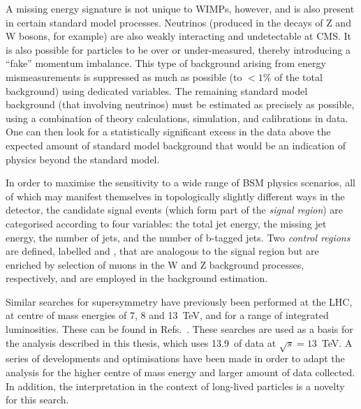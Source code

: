 A missing energy signature is not unique to WIMPs, however, and is also present 
in certain standard model processes. Neutrinos (produced in the decays of Z and 
W bosons, for example) are also weakly interacting and undetectable at CMS. It 
is also possible for particles to be over or under-measured, thereby 
introducing a ``fake'' momentum imbalance. This type of background arising from 
energy mismeasurements is suppressed as much as possible (to $<1\%$ of the 
total background) using dedicated variables. %
The remaining standard 
model background (that involving neutrinos) must be estimated as precisely as 
possible, using a combination of theory calculations, simulation, and 
calibrations in data. %
One can then look for a 
statistically significant excess in the data above the expected amount of 
standard model background that would be an indication of %
physics beyond the standard model. %

In order to maximise the sensitivity to a wide range of BSM physics %
scenarios, 
all of which may manifest themselves in topologically slightly different ways 
in the detector, the candidate signal events (which form part of the 
\textit{signal region}) are categorised according to four variables: the total 
jet energy, the missing jet energy, the number of jets, and the number of 
b-tagged jets. %
Two \textit{control regions} are defined, labelled \mj and 
\mmj, that are analogous to the signal region but are enriched by 
selection of muons in the W and Z background processes, respectively, and are 
employed in the background estimation.%

Similar searches for supersymmetry have previously been performed %
at the LHC, at centre of mass energies of 7, 8 and 13~TeV, and for a range of 
integrated luminosities. These can be found in 
Refs.~\cite{alphat1,alphat2,alphat3,alphat4,alphat5}. These 
searches are used as a basis for the analysis described in this thesis, which 
uses 13.9~\ifb of data at $\sqrt{s}=13$~TeV. A 
series of developments and optimisations have been made in order to adapt the 
analysis for the higher centre of mass energy and larger amount of data 
collected. In addition, the interpretation in the context of %
long-lived particles %
is a novelty for this search.

